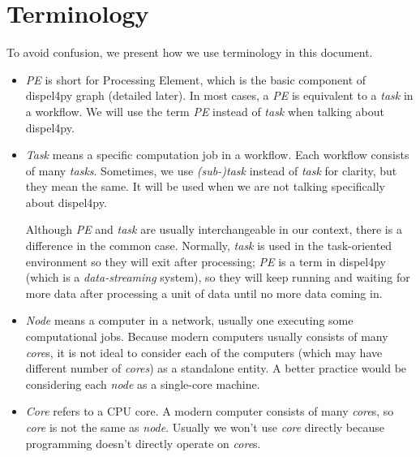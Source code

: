 \chapter{Terminology}
To avoid confusion, we present how we use terminology in this document.

\newenvironment{term_box}{\begin{tcolorbox}[enhanced,width=5in,size=fbox,
    fontupper=\large\bfseries,drop shadow southwest,sharp corners]}{
\end{tcolorbox}}

\begin{itemize}

\item \emph{PE} is short for Processing Element, which is the basic component of dispel4py graph (detailed later). In most cases, a \emph{PE} is equivalent to a \emph{task} in a workflow. We will use the term \emph{PE} instead of \emph{task} when talking about dispel4py.

\item \emph{Task} means a specific computation job in a workflow. Each workflow consists of many \emph{tasks}. Sometimes, we use \emph{(sub-)task} instead of \emph{task} for clarity, but they mean the same. It will be used when we are not talking specifically about dispel4py.

\begin{term_box}
Although \emph{PE} and \emph{task} are usually interchangeable in our context, there is a difference in the common case. Normally, \emph{task} is used in the task-oriented environment so they will exit after processing; \emph{PE} is a term in dispel4py (which is a \emph{data-streaming} system), so they will keep running and waiting for more data after processing a unit of data until no more data coming in.
\end{term_box}	
	
\item \emph{Node} means a computer in a network, usually one executing some computational jobs. Because modern computers usually consists of many \emph{core}s, it is not ideal to consider each of the computers (which may have different number of \emph{cores}) as a standalone entity. A better practice would be considering each \emph{node} as a single-core machine.

\item \emph{Core} refers to a CPU core. A modern computer consists of many \emph{core}s, so \emph{core} is not the same as \emph{node}. Usually we won't use \emph{core} directly because programming doesn't directly operate on \emph{core}s.


\end{itemize}

